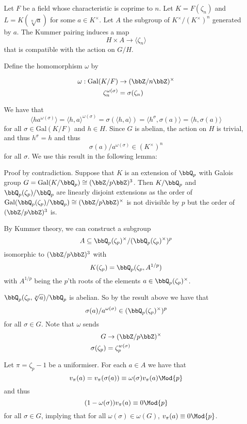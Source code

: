 \documentclass[a4paper, 12pt,oneside,openany]{book}
\begin{document}
Let $F$ be a field whose characteristic is coprime to $n$. Let $K=F(\zeta_n)$ and $L=K(\sqrt[n]{a})$ for some $a \in K^\times$. Let $A$ the subgroup of $K^\times / (K^\times)^n$ generated by $a$. The Kummer pairing induces a map $$H \times A \to \langle \zeta_n \rangle$$ that is compatible with the action on $G/H$. 

Define the homomorphism $\omega$ by 

\begin{align*} 
\omega: \text{Gal}(K/F) &\to (\bbZ/n\bbZ)^\times \\
\zeta_n^{\omega(\sigma)} &= \sigma(\zeta_n)
\end{align*}

We have that $$\langle h a^{\omega(\sigma)} \rangle=\langle h,a\rangle^{\omega(\sigma)} =\sigma(\langle h, a\rangle) = \langle h^{\sigma}, \sigma(a) \rangle = \langle h, \sigma(a) \rangle$$ for all $\sigma \in \text{Gal}(K/F)$ and $h \in H$. Since $G$ is abelian, the action on $H$ is trivial, and thus $h^\sigma = h$ and thus $$\sigma(a)/a^{\omega(\sigma)} \in (K^\times)^n$$ for all $\sigma$. We use this result in the following lemma:


 Proof by contradiction. Suppose that $K$ is an extension of $\bbQ_p$ with Galois group $G=\text{Gal}(K/\bbQ_p) \cong (\bbZ/p\bbZ)^3$. Then $K/\bbQ_p$ and $\bbQ_p(\zeta_p)/\bbQ_p$ are linearly disjoint extensions as the order of $\text{Gal}(\bbQ_p(\zeta_p)/\bbQ_p) \cong (\bbZ/p\bbZ)^\times$ is not divisible by $p$ but the order of $(\bbZ/p\bbZ)^3$ is. 

By Kummer theory, we can construct a subgroup $$A \subseteq \bbQ_p(\zeta_p)^\times / (\bbQ_p(\zeta_p)^\times)^p$$ isomorphic to $(\bbZ/p\bbZ)^3$ with $$K(\zeta_p)= \bbQ_p(\zeta_p, A^{1/p})$$ with $A^{1/p}$ being the $p$'th roots of the elements $a \in \bbQ_p(\zeta_p)^\times$.

$\bbQ_p(\zeta_p, \sqrt[p]{a})/\bbQ_p$ is abelian. So by the result above we have that $$\sigma(a)/a^{\omega(\sigma)} \in (\bbQ_p(\zeta_p)^\times)^p$$ for all $\sigma \in G$. Note that $\omega$ sends 
\begin{align*}
	G &\to (\bbZ/p\bbZ)^\times \\
	\sigma(\zeta_p) &= \zeta_p^{w(\sigma)}
\end{align*}

Let $\pi = \zeta_p-1$ be a uniformiser. For each $a \in A$ we have that $$v_\pi(a) = v_\pi(\sigma(a)) \equiv \omega(\sigma) v_\pi(a) \Mod{p}$$ and thus $$(1-\omega(\sigma))v_\pi(a) \equiv 0 \Mod{p}$$ for all $\sigma \in G$, implying that for all $\omega(\sigma) \in \omega(G)$, $v_\pi(a) \equiv 0 \Mod{p}$. 
\end{document}
